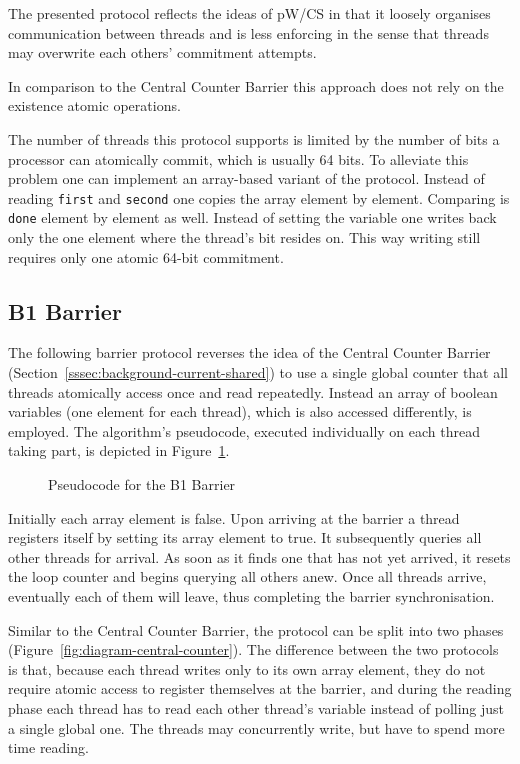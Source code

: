 \documentclass[a4paper, 10pt]{article}
\begin{document}
The presented protocol reflects the ideas of pW/CS in that it loosely organises communication between threads and is less enforcing in the sense that threads may overwrite each others' commitment attempts.

In comparison to the Central Counter Barrier this approach does not rely on the existence atomic operations.

The number of threads this protocol supports is limited by the number of bits a processor can atomically commit, which is usually 64 bits. To alleviate this problem one can implement an array-based variant of the protocol. Instead of reading \texttt{first} and \texttt{second} one copies the array element by element. Comparing is \texttt{done} element by element as well. Instead of setting the variable one writes back only the one element where the thread's bit resides on. This way writing still requires only one atomic 64-bit commitment.

\subsection{B1 Barrier}
\label{ssec:new-b1}

The following barrier protocol reverses the idea of the Central Counter Barrier (Section~\ref{sssec:background-current-shared}) to use a single global counter that all threads atomically access once and read repeatedly. Instead an array of boolean variables (one element for each thread), which is also accessed differently, is employed.
The algorithm's pseudocode, executed individually on each thread taking part, is depicted in Figure~\ref{fig:pseudocode-b1}.

\begin{figure}[htbp]
	\centering
	
	\caption{Pseudocode for the B1 Barrier}
	\label{fig:pseudocode-b1}
\end{figure}

Initially each array element is false. Upon arriving at the barrier a thread registers itself by setting its array element to true. It subsequently queries all other threads for arrival. As soon as it finds one that has not yet arrived, it resets the loop counter and begins querying all others anew. Once all threads arrive, eventually each of them will leave, thus completing the barrier synchronisation.

Similar to the Central Counter Barrier, the protocol can be split into two phases (Figure~\ref{fig:diagram-central-counter}).
The difference between the two protocols is that, because each thread writes only to its own array element, they do not require atomic access to register themselves at the barrier, and during the reading phase each thread has to read each other thread's variable instead of polling just a single global one. The threads may concurrently write, but have to spend more time reading.
\end{document}
